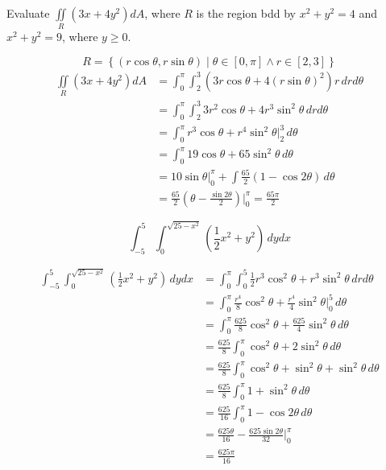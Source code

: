 \begin{exercise}
    Evaluate \(\iint\limits_{R}\left( 3x+4y^2 \right)dA \), where \(R\) is the region bdd by \(x^2 +y^2 =4\) and \(x^2+y^2 =9\), where \(y\geq 0\).
\end{exercise}
\begin{solution}
    \[
        R =\left\{ (r\cos \theta ,r\sin \theta )\mid \theta \in[0,\pi ]\land r\in[2,3] \right\}
    \]
    \begin{align*}
        \iint\limits_{R}\left( 3x+4y^2 \right)dA&=\int_0^\pi \int_2^3 \left( 3r\cos \theta +4(r\sin \theta )^2 \right)r\,drd \theta \\
        &=\int_0^\pi \int_2^3 3r^2 \cos \theta +4r^{3}\sin^2 \theta \,drd \theta \\
        &=\int_0^\pi r^3 \cos \theta +r^4 \sin^2 \theta \biggl\vert_2^3 \,d \theta \\
        &=\int_0^\pi 19\cos \theta +65\sin^2 \theta \,d \theta \\
        &=10\sin \theta \big\vert_0^\pi +\int \frac{65}{2}\left( 1-\cos 2\theta  \right) \,d \theta \\
        &=\frac{65}{2}\left( \theta -\frac{\sin 2\theta }{2} \right) \biggl\vert_0^\pi =\frac{65\pi}{2}
    \end{align*}
\end{solution}
\begin{exercise}
    \[
        \int _{-5}^5 \int_0^{\sqrt{25-x^2} } \left( \frac{1}{2}x^ 2+y^2 \right)\,dydx
    \]
\end{exercise}
\begin{solution}
    \begin{align*}
        \int _{-5}^5 \int_0^{\sqrt{25-x^2} } \left( \frac{1}{2}x^ 2+y^2 \right)\,dydx&= \int_0^\pi \int_0^5 \frac{1}{2}r^3 \cos^2 \theta + r^3 \sin ^2 \theta \,drd \theta\\
        &=\int_0^\pi \frac{r^4}{8}\cos ^2\theta +\frac{r^4}{4}\sin ^2\theta \biggl\vert_0^5\,d \theta \\
        &=\int_0^\pi \frac{625}{8}\cos ^2\theta +\frac{625}{4}\sin ^2\theta \,d \theta \\
        &=\frac{625}{8}\int_0^\pi \cos ^2\theta +2\sin ^2\theta \,d \theta \\
        &= \frac{625}{8}\int_0^\pi \cos ^2\theta +\sin ^2\theta +\sin ^2\theta \,d \theta \\
        &=\frac{625}{8}\int_0^\pi 1+\sin ^2\theta \,d \theta \\
        &=\frac{625}{16}\int_0^\pi 1-\cos 2\theta \,d \theta \\
        &=\frac{625\theta}{16}-\frac{625\sin2\theta}{32}\biggl\vert_0^\pi \\
        &=\frac{625\pi}{16}
    \end{align*}
\end{solution}
